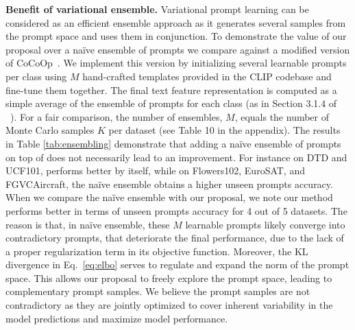 \documentclass[10pt,twocolumn,letterpaper]{article}
\begin{document}
\textbf{Benefit of variational ensemble.} 
Variational prompt learning can be considered as an efficient ensemble approach as it generates several samples from the prompt space and uses them in conjunction. To demonstrate the value of our proposal over a na\"ive ensemble of prompts we compare against a modified version of CoCoOp~\cite{zhou2022conditional}. We implement this version by initializing several learnable prompts per class using $M$ hand-crafted templates provided in the CLIP codebase and fine-tune them together. 
The final text feature representation is computed as a simple average of the ensemble of prompts for each class (as in Section 3.1.4 of ~\cite{clip_icml21}). For a fair comparison, the number of ensembles, $M$, equals the number of Monte Carlo samples $K$ per dataset (see Table 10 in the appendix). 
The results in Table \ref{tab:ensembling} demonstrate that adding a na\"ive ensemble of prompts on top of \cocoop does not necessarily lead to an improvement.
For instance on DTD and UCF101, \cocoop performs better by itself, while on Flowers102, EuroSAT, and FGVCAircraft, the na\"ive ensemble obtains a higher unseen prompts accuracy. 
When we compare the na\"ive ensemble with our proposal, we note our method performs better in terms of unseen prompts accuracy for 4 out of 5 datasets. The reason is that, in na\"ive ensemble, these $M$ learnable prompts likely converge into contradictory prompts, that deteriorate the final performance, due to the lack of a proper regularization term in its objective function. 
Moreover, the KL divergence in Eq.~\ref{eq:elbo} serves to regulate and expand the norm of the prompt space. This allows our proposal to freely explore the prompt space, leading to complementary prompt samples. We believe the prompt samples are not contradictory as they are jointly optimized to cover inherent variability in the model predictions and maximize model performance.

\begin{table}[t]
\centering
\caption{\textbf{Benefit of variational ensemble.} 
Our conditional Bayesian prompt learning outperforms \cocoop and its na\"ive ensemble for 4 out of 5 datasets regarding unseen prompts accuracy, demonstrating that our method is effective in constructing informative prompt samples for ensemble learning in a data-driven manner.}
\vspace{-2mm}
\label{tab:ensembling}
\vspace{-5mm}
\end{table}
\end{document}
